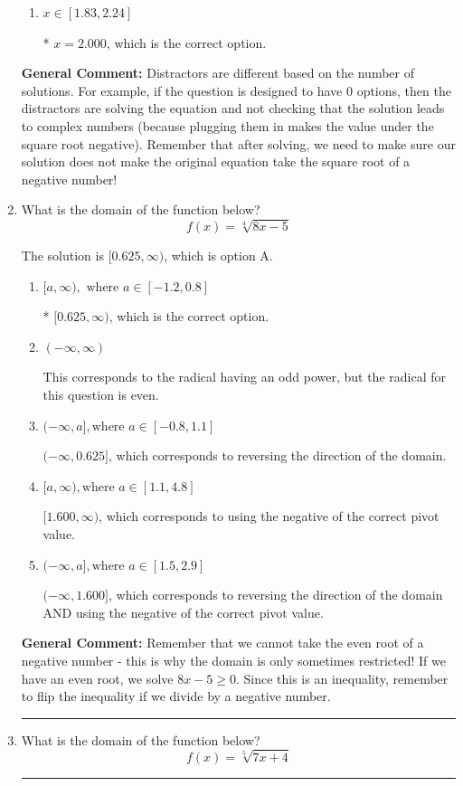 \documentclass{extbook}[14pt]
\newcommand{\litem}[1]{\item #1

\rule{\textwidth}{0.4pt}}
\begin{document}
\begin{enumerate}
{\begin{enumerate}[label=\Alph*.]
$x = 0.250$ and $x = 2.000$, which corresponds to solving the equation correctly and including the value that makes the first square root 0.
\item \( x \in [1.83,2.24] \)

* $x = 2.000$, which is the correct option.
\end{enumerate}

\textbf{General Comment:} Distractors are different based on the number of solutions. For example, if the question is designed to have 0 options, then the distractors are solving the equation and not checking that the solution leads to complex numbers (because plugging them in makes the value under the square root negative). Remember that after solving, we need to make sure our solution does not make the original equation take the square root of a negative number!
}
\litem{
What is the domain of the function below?
\[ f(x) = \sqrt[4]{8 x - 5} \]

The solution is \( [0.625, \infty) \), which is option A.\begin{enumerate}[label=\Alph*.]
\item \( [a, \infty), \text{ where } a \in [-1.2, 0.8] \)

* $[0.625, \infty)$, which is the correct option.
\item \( (-\infty, \infty) \)

This corresponds to the radical having an odd power, but the radical for this question is even.
\item \( (-\infty, a], \text{where } a \in [-0.8, 1.1] \)

 $(-\infty, 0.625]$, which corresponds to reversing the direction of the domain.
\item \( [a, \infty), \text{where } a \in [1.1, 4.8] \)

$[1.600, \infty)$, which corresponds to using the negative of the correct pivot value.
\item \( (-\infty, a], \text{where } a \in [1.5, 2.9] \)

$(-\infty, 1.600]$, which corresponds to reversing the direction of the domain AND using the negative of the correct pivot value.
\end{enumerate}

\textbf{General Comment:} Remember that we cannot take the even root of a negative number - this is why the domain is only sometimes restricted! If we have an even root, we solve $8 x - 5 \geq 0$. Since this is an inequality, remember to flip the inequality if we divide by a negative number.
}
\litem{
What is the domain of the function below?
\[ f(x) = \sqrt[5]{7 x + 4} \]

}
\end{enumerate}
\end{document}
